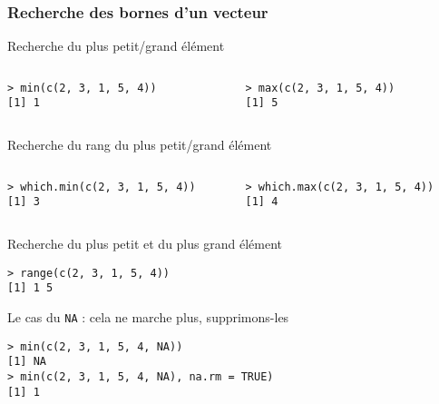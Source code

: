 \documentclass[10pt]{beamer}
\begin{document}
\begin{frame}[fragile]
  \frametitle{Recherche des bornes d'un vecteur}

\begin{block}{Recherche du plus petit/grand élément}
  \begin{columns}[t]
      \begin{column}{0.49\textwidth}
  \begin{lstlisting}
> min(c(2, 3, 1, 5, 4))
[1] 1
  \end{lstlisting}
\end{column}
\begin{column}{0.49\textwidth}
  \begin{lstlisting}
> max(c(2, 3, 1, 5, 4))
[1] 5
\end{lstlisting}
\end{column}
\end{columns}
  \end{block}

    \begin{block}{Recherche du rang du plus petit/grand élément}
    \begin{columns}[t]
      \begin{column}{0.49\textwidth}
  \begin{lstlisting}
> which.min(c(2, 3, 1, 5, 4))
[1] 3
  \end{lstlisting}
\end{column}
\begin{column}{0.49\textwidth}
  \begin{lstlisting}
> which.max(c(2, 3, 1, 5, 4))
[1] 4
\end{lstlisting}
\end{column}
\end{columns}
\end{block}

  \begin{block}{Recherche du plus petit et du plus grand élément}
   \begin{lstlisting}[style=block]
> range(c(2, 3, 1, 5, 4))
[1] 1 5
  \end{lstlisting}
\end{block}
\begin{block}{Le cas du \texttt{NA} : cela ne marche plus, supprimons-les}
  \begin{lstlisting}[style=block]
> min(c(2, 3, 1, 5, 4, NA))
[1] NA
> min(c(2, 3, 1, 5, 4, NA), na.rm = TRUE)
[1] 1
  \end{lstlisting}
\end{block}
\end{frame}
\end{document}
